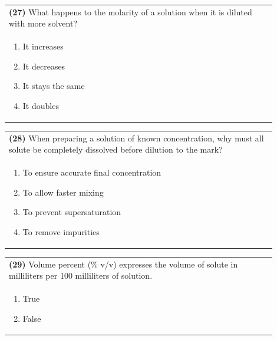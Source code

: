 \documentclass{article}
\begin{document}
\noindent\begin{tabular}{|p{0.9\linewidth}|}
\hline
\textbf{(27)} What happens to the molarity of a solution when it is diluted with more solvent?\\[0.2cm]
\begin{minipage}[t]{0.85\linewidth}
\begin{enumerate}[label=\alph*.]
\item It increases
\item It decreases
\item It stays the same
\item It doubles
\end{enumerate}
\end{minipage}\\[0.2cm]
\hline
\end{tabular}

\noindent\begin{tabular}{|p{0.9\linewidth}|}
\hline
\textbf{(28)} When preparing a solution of known concentration, why must all solute be completely dissolved before dilution to the mark?\\[0.2cm]
\begin{minipage}[t]{0.85\linewidth}
\begin{enumerate}[label=\alph*.]
\item To ensure accurate final concentration
\item To allow faster mixing
\item To prevent supersaturation
\item To remove impurities
\end{enumerate}
\end{minipage}\\[0.2cm]
\hline
\end{tabular}
\newpage

\noindent\begin{tabular}{|p{0.9\linewidth}|}
\hline
\textbf{(29)} Volume percent (\% v/v) expresses the volume of solute in milliliters per 100 milliliters of solution.\\[0.2cm]
\begin{minipage}[t]{0.85\linewidth}
\begin{enumerate}[label=\alph*.]
\item True
\item False
\end{enumerate}
\end{minipage}\\[0.2cm]
\hline
\end{tabular}
\end{document}
